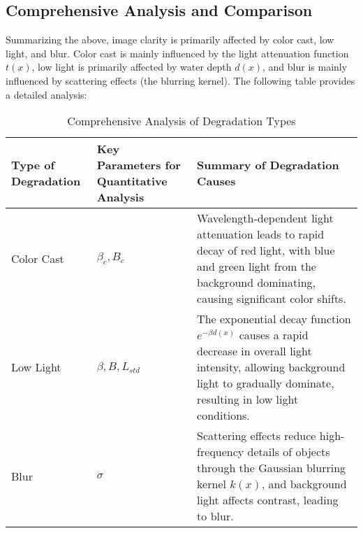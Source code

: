\documentclass[11pt]{article}
\begin{document}
    \subsection{Comprehensive Analysis and Comparison}
    Summarizing the above, image clarity is primarily affected by color cast, low light, and blur.
    Color cast is mainly influenced by the light attenuation function \( t(x) \), low light is primarily affected by water depth \( d(x) \),
    and blur is mainly influenced by scattering effects (the blurring kernel). The following table provides a detailed analysis:

    \begin{table}[ht]
    \centering
    \begin{tabularx}{\textwidth}{|>{\centering\arraybackslash}X|>{\centering\arraybackslash}X|>{\centering\arraybackslash}X|}
    \hline
    \textbf{Type of Degradation} & \textbf{Key Parameters for Quantitative Analysis} & \textbf{Summary of Degradation Causes} \\ \hline
    Color Cast & $\beta_c, B_c$ & Wavelength-dependent light attenuation leads to rapid decay of red light, with blue and green light from the background dominating, causing significant color shifts. \\ \hline
    Low Light & $\beta, B, L_{std}$ & The exponential decay function $e^{-\beta d(x)}$ causes a rapid decrease in overall light intensity, allowing background light to gradually dominate, resulting in low light conditions. \\ \hline
    Blur & $\sigma$ & Scattering effects reduce high-frequency details of objects through the Gaussian blurring kernel $k(x)$, and background light affects contrast, leading to blur. \\ \hline
    \end{tabularx}
    \caption{Comprehensive Analysis of Degradation Types}
    \end{table}
\end{document}
